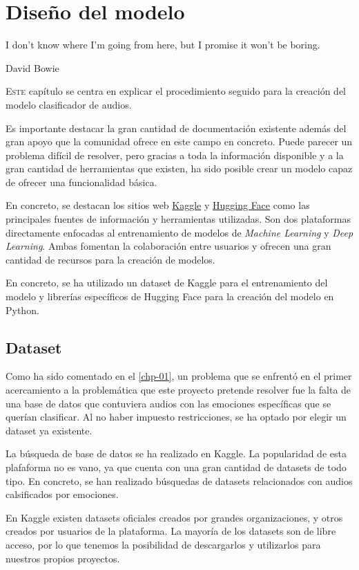 \chapter{Diseño del modelo}\label{chp-02}
\epigraph{I don't know where I'm going from here, but I promise it won't be boring.}{David Bowie}
\lettrine[lraise=-0.1, lines=2, loversize=0.2]{E}{ste} capítulo se centra en explicar el procedimiento seguido para la creación del modelo clasificador de audios.

Es importante destacar la gran cantidad de documentación existente además del gran apoyo que la comunidad ofrece en este campo en concreto.
Puede parecer un problema difícil de resolver, pero gracias a toda la información disponible y a la gran cantidad de herramientas que existen, ha sido posible crear un modelo capaz de ofrecer una funcionalidad básica.

En concreto, se destacan los sitios web \href{https://www.kaggle.com/}{Kaggle} y \href{https://huggingface.co/}{Hugging Face} como las principales fuentes de información y herramientas utilizadas.
Son dos plataformas directamente enfocadas al entrenamiento de modelos de \textit{Machine Learning} y \textit{Deep Learning}.
Ambas fomentan la colaboración entre usuarios y ofrecen una gran cantidad de recursos para la creación de modelos.

En concreto, se ha utilizado un dataset de Kaggle para el entrenamiento del modelo y librerías específicos de Hugging Face para la creación del modelo en Python.


\section{Dataset}\label{seccion:dataset}
Como ha sido comentado en el \autoref{chp-01}, un problema que se enfrentó en el primer acercamiento a la problemática que este proyecto pretende resolver fue la falta de una base de datos que contuviera audios con las emociones específicas que se querían clasificar.
Al no haber impuesto restricciones, se ha optado por elegir un dataset ya existente.

La búsqueda de base de datos se ha realizado en Kaggle.
La popularidad de esta plafaforma no es vano, ya que cuenta con una gran cantidad de datasets de todo tipo.
En concreto, se han realizado búsquedas de datasets relacionados con audios calsificados por emociones.

En Kaggle existen datasets oficiales creados por grandes organizaciones, y otros creados por usuarios de la plataforma.
La mayoría de los datasets son de libre acceso, por lo que tenemos la posibilidad de descargarlos y utilizarlos para nuestros propios proyectos.

